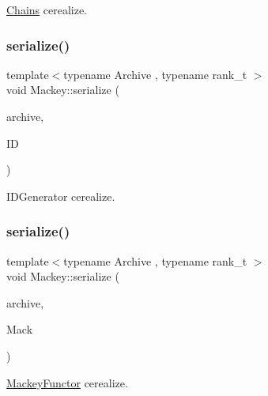 \hyperlink{classMackey_1_1Chains}{Chains} cerealize. 

\mbox{\label{namespaceMackey_ac78e550c9949977ed71367fb21892e93}} 
\subsubsection{\texorpdfstring{serialize()}{serialize()}\hspace{0.1cm}{\footnotesize\ttfamily [3/7]}}
{\footnotesize\ttfamily template$<$typename Archive , typename rank\+\_\+t $>$ \\
void Mackey\+::serialize (\begin{DoxyParamCaption}\item[{Archive \&}]{archive,  }\item[{\hyperlink{classMackey_1_1IDGenerators}{I\+D\+Generators}$<$ rank\+\_\+t $>$ \&}]{ID }\end{DoxyParamCaption})}



I\+D\+Generator cerealize. 

\mbox{\label{namespaceMackey_aa1f463e9991b727f5c74e430eccee044}} 
\subsubsection{\texorpdfstring{serialize()}{serialize()}\hspace{0.1cm}{\footnotesize\ttfamily [4/7]}}
{\footnotesize\ttfamily template$<$typename Archive , typename rank\+\_\+t $>$ \\
void Mackey\+::serialize (\begin{DoxyParamCaption}\item[{Archive \&}]{archive,  }\item[{\hyperlink{classMackey_1_1MackeyFunctor}{Mackey\+Functor}$<$ rank\+\_\+t $>$ \&}]{Mack }\end{DoxyParamCaption})}



\hyperlink{classMackey_1_1MackeyFunctor}{Mackey\+Functor} cerealize. 

\mbox{\label{namespaceMackey_a73c4c78b9c9858acc875da9516535d4b}} 
